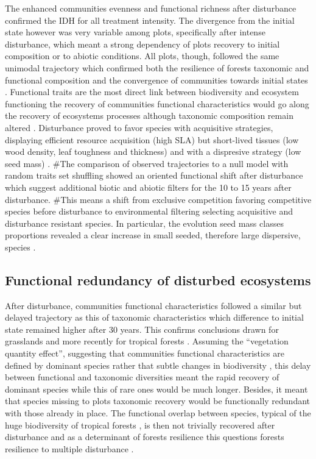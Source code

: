 \documentclass[fleqn,10pt]{ArtEcoFoG} %
\theoremstyle{definition}
\theoremstyle{definition}
\theoremstyle{definition}
\theoremstyle{remark}
\begin{document}
The enhanced communities evenness and functional richness after
disturbance confirmed the IDH for all treatment intensity. The
divergence from the initial state however was very variable among plots,
specifically after intense disturbance, which meant a strong dependency
of plots recovery to initial composition or to abiotic conditions. All
plots, though, followed the same unimodal trajectory which confirmed
both the resilience of forests taxonomic and functional composition and
the convergence of communities towards initial states
\citep{Hubbell1999, Molino2001, Baraloto2012a}. Functional traits are
the most direct link between biodiversity and ecosystem functioning
\citep{Diaz2005} the recovery of communities functional characteristics
would go along the recovery of ecosystems processes although taxonomic
composition remain altered \citep{Guariguata2001}. Disturbance proved to
favor species with acquisitive strategies, displaying efficient resource
acquisition (high SLA) but short-lived tissues (low wood density, leaf
toughness and thickness) and with a dispresive strategy (low seed mass)
\citep{Westoby1998, Wright2004, Reich2014}. \#The comparison of observed
trajectories to a null model with random traits set shuffling showed an
oriented functional shift after disturbance which suggest additional
biotic and abiotic filters for the 10 to 15 years after disturbance.
\#This means a shift from exclusive competition favoring competitive
species before disturbance to environmental filtering selecting
acquisitive and disturbance resistant species. In particular, the
evolution seed mass classes proportions revealed a clear increase in
small seeded, therefore large dispersive, species
\citep{TerSteege2001, Flores2006, Haddad2008}.

\subsection{Functional redundancy of disturbed
ecosystems}\label{functional-redundancy-of-disturbed-ecosystems}

After disturbance, communities functional characteristics followed a
similar but delayed trajectory as this of taxonomic characteristics
which difference to initial state remained higher after 30 years. This
confirms conclusions drawn for grasslands
\citep{Tilman1997, Mouillot2011} and more recently for tropical forests
\citep{Lohbeck2015, Guariguata2001}. Assuming the ``vegetation quantity
effect'', suggesting that communities functional characteristics are
defined by dominant species rather that subtle changes in biodiversity
\citep{Grime1998}, this delay between functional and taxonomic
diversities meant the rapid recovery of dominant species while this of
rare ones would be much longer. Besides, it meant that species missing
to plots taxonomic recovery would be functionally redundant with those
already in place. The functional overlap between species, typical of the
huge biodiversity of tropical forests \citep{Bellwood2006}, is then not
trivially recovered after disturbance and as a determinant of forests
resilience this questions forests resilience to multiple disturbance
\citep{Trenbath1999, Elmqvist2003, Diaz2005}.
\end{document}

